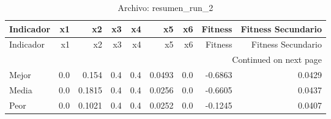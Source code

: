 \begin{longtable}{lrrrrrrrr}
\caption{Archivo: resumen\_run\_2}\label{tab:resumen_run_2} \\
\toprule
Indicador & x1 & x2 & x3 & x4 & x5 & x6 & Fitness & Fitness Secundario \\
\midrule
\endfirsthead
\toprule
Indicador & x1 & x2 & x3 & x4 & x5 & x6 & Fitness & Fitness Secundario \\
\midrule
\endhead
\midrule
\multicolumn{9}{r}{Continued on next page} \\
\midrule
\endfoot
\bottomrule
\endlastfoot
Mejor & 0.0 & 0.154 & 0.4 & 0.4 & 0.0493 & 0.0 & -0.6863 & 0.0429 \\
Media & 0.0 & 0.1815 & 0.4 & 0.4 & 0.0256 & 0.0 & -0.6605 & 0.0437 \\
Peor & 0.0 & 0.1021 & 0.4 & 0.4 & 0.0252 & 0.0 & -0.1245 & 0.0407 \\
\end{longtable}